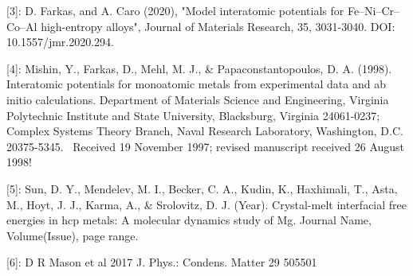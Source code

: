\documentclass[a4paper,11pt]{article} %
\begin{document}
[3]: D. Farkas, and A. Caro (2020), "Model interatomic potentials for Fe–Ni–Cr–Co–Al high-entropy alloys", Journal of Materials Research, 35, 3031-3040. DOI: 10.1557/jmr.2020.294.

[4]: Mishin, Y., Farkas, D., Mehl, M. J., \& Papaconstantopoulos, D. A. (1998). Interatomic potentials for monoatomic metals from experimental data and ab initio calculations. Department of Materials Science and Engineering, Virginia Polytechnic Institute and State University, Blacksburg, Virginia 24061-0237; Complex Systems Theory Branch, Naval Research Laboratory, Washington, D.C. 20375-5345. ~Received 19 November 1997; revised manuscript received 26 August 1998!

[5]: Sun, D. Y., Mendelev, M. I., Becker, C. A., Kudin, K., Haxhimali, T., Asta, M., Hoyt, J. J., Karma, A., \& Srolovitz, D. J. (Year). Crystal-melt interfacial free energies in hcp metals: A molecular dynamics study of Mg. Journal Name, Volume(Issue), page range.

[6]: D R Mason et al 2017 J. Phys.: Condens. Matter 29 505501
\end{document}
